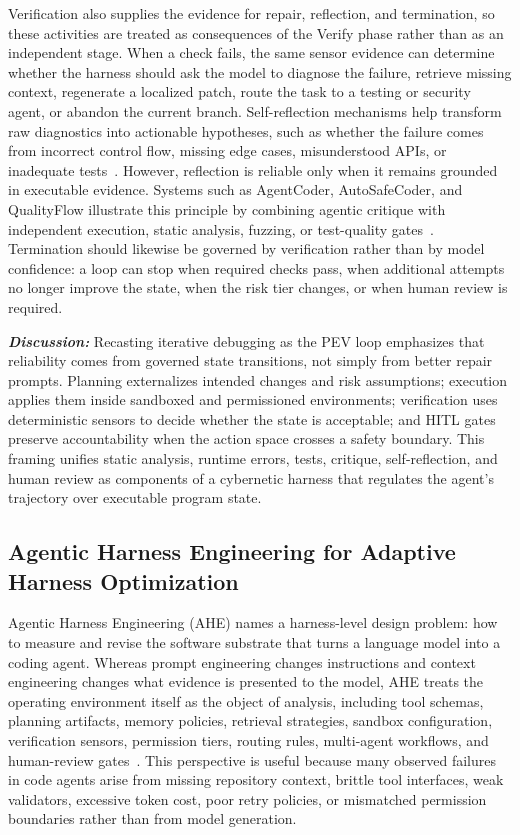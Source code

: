 Verification also supplies the evidence for repair, reflection, and termination, so these activities are treated as consequences of the Verify phase rather than as an independent stage. When a check fails, the same sensor evidence can determine whether the harness should ask the model to diagnose the failure, retrieve missing context, regenerate a localized patch, route the task to a testing or security agent, or abandon the current branch. Self-reflection mechanisms help transform raw diagnostics into actionable hypotheses, such as whether the failure comes from incorrect control flow, missing edge cases, misunderstood APIs, or inadequate tests~\cite{Wu2025IterPrefFP, Pan2025CodeCoR}. However, reflection is reliable only when it remains grounded in executable evidence. Systems such as AgentCoder, AutoSafeCoder, and QualityFlow illustrate this principle by combining agentic critique with independent execution, static analysis, fuzzing, or test-quality gates~\cite{huang2023agentcoder, Nunez2024AutoSafeCoder, Hu2025QualityFlow}. Termination should likewise be governed by verification rather than by model confidence: a loop can stop when required checks pass, when additional attempts no longer improve the state, when the risk tier changes, or when human review is required.

\textbf{\textit{Discussion:}} Recasting iterative debugging as the PEV loop emphasizes that reliability comes from governed state transitions, not simply from better repair prompts. Planning externalizes intended changes and risk assumptions; execution applies them inside sandboxed and permissioned environments; verification uses deterministic sensors to decide whether the state is acceptable; and HITL gates preserve accountability when the action space crosses a safety boundary. This framing unifies static analysis, runtime errors, tests, critique, self-reflection, and human review as components of a cybernetic harness that regulates the agent's trajectory over executable program state.


\subsection{Agentic Harness Engineering for Adaptive Harness Optimization}
\label{sec:ahe}



Agentic Harness Engineering (AHE) names a harness-level design problem: how to measure and revise the software substrate that turns a language model into a coding agent. Whereas prompt engineering changes instructions and context engineering changes what evidence is presented to the model, AHE treats the operating environment itself as the object of analysis, including tool schemas, planning artifacts, memory policies, retrieval strategies, sandbox configuration, verification sensors, permission tiers, routing rules, multi-agent workflows, and human-review gates~\cite{lin2026agentic, zhou2026externalization}. This perspective is useful because many observed failures in code agents arise from missing repository context, brittle tool interfaces, weak validators, excessive token cost, poor retry policies, or mismatched permission boundaries rather than from model generation.

